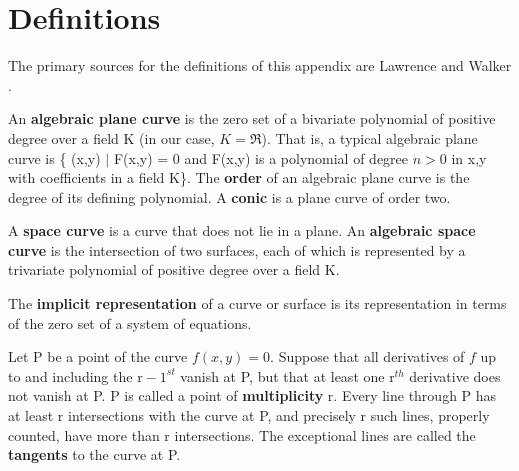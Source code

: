 \chapter{Definitions}
\label{app-defn}
%
The primary sources for the definitions of this appendix are Lawrence
\cite{lawrence} and Walker \cite{wa}.

An {\bf algebraic plane curve} is the zero set of a bivariate polynomial
of positive degree over a field K (in our case, $K = \Re$).
That is, a typical algebraic plane curve is 
\{ (x,y) $|$ F(x,y) = 0 and F(x,y) is a polynomial of degree $n>0$ in x,y with
coefficients in a field K\}.
The {\bf order} of an algebraic plane curve is the degree of 
its defining polynomial.
A {\bf conic} is a plane curve of order two.

A {\bf space curve} is a curve that does not lie in a plane.
An {\bf algebraic space curve} is the intersection of two 
surfaces, each of which is represented by a trivariate polynomial of
positive degree over a field K.

The {\bf implicit representation} of a curve or surface is its representation
in terms of the zero set of a system of equations.

Let P be a point of the curve $f(x,y) = 0$.
Suppose that 
all derivatives of $f$ up to and including the $\mbox{r}-1^{st}$ vanish at P,
but that at least one $\mbox{r}^{th}$ derivative does not vanish at P.
P is called a point of {\bf multiplicity} r.
Every line through P has at least r intersections with the curve at P,
and precisely r such lines, properly counted, have more than r intersections.
The exceptional lines are called the {\bf tangents} to the curve at P.

